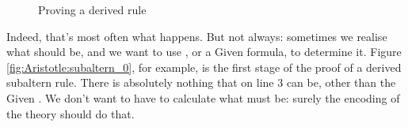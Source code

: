 \begin{figure}
{\label{fig:Aristotle:subaltern_1}}
\caption{Proving a derived rule}
\label{fig:Aristotle:subaltern_various}
\end{figure}
Indeed, that's most often what happens. But not always: sometimes we realise what  should be, and we want to use , or a Given formula, to determine it. Figure \ref{fig:Aristotle:subaltern_0}, for example, is the first stage of the proof of a derived subaltern rule. There is absolutely nothing that  on line 3 can be, other than the Given . We don't want to have to calculate what  must be: surely the encoding of the theory should do that. 

